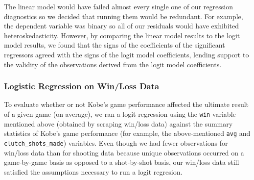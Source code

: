 \documentclass[paper=a4, fontsize=11pt]{scrartcl} %
\numberwithin{equation}{section} %
\numberwithin{figure}{section} %
\numberwithin{table}{section} %
\begin{document}
\hspace*{1cm}The linear model would have failed almost every single one of our regression diagnostics so we decided that running them would be redundant. For example, the dependent variable was binary so all of our residuals would have exhibited heteroskedasticity. However, by comparing the linear model results to the logit model results, we found that the signs of the coefficients of the significant regressors agreed with the signs of the logit model coefficients, lending support to the validity of the observations derived from the logit model coefficients. 

\subsubsection{Logistic Regression on Win/Loss Data}
\hspace*{1cm}To evaluate whether or not Kobe's game performance affected the ultimate result of a given game (on average), we ran a logit regression using the \texttt{win} variable mentioned above (obtained by scraping win/loss data) against the summary statistics of Kobe's game performance (for example, the above-mentioned \texttt{avg} and \texttt{clutch\_shots\_made}) variables. Even though we had fewer observations for win/loss data than for shooting data because unique observations occurred on a game-by-game basis as opposed to a shot-by-shot basis, our win/loss data still satisfied the assumptions necessary to run a logit regresion. 
\end{document}
